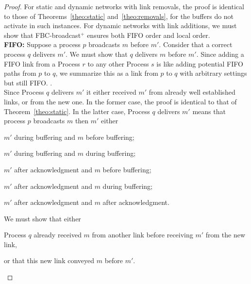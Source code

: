 \begin{theorem}
\end{theorem}

\begin{proof}
  For static and dynamic networks with link removals, the proof is identical to
  those of Theorems~\ref{theo:static} and~\ref{theo:removals}, for the buffers
  do not activate in such instances. For dynamic networks with link additions,
  we must show that FBC-broadcast$^+$ ensures both
  FIFO order and local order. \\
  \textbf{FIFO:} Suppose a process $p$ broadcasts $m$ before $m'$. Consider that
  a correct process $q$ delivers $m'$. We must show that $q$ delivers $m$ before
  $m'$.  Since adding a FIFO link from a Process $r$ to any other Process $s$ is
  like adding potential FIFO paths from $p$ to $q$, we summarize this as a link
  from $p$ to $q$ with arbitrary settings but still FIFO.  . \\   
  Since Process $q$ delivers $m'$ it either received $m'$ from already well
  established links, or from the new one. In the former case, the proof is
  identical to that of Theorem~\ref{theo:static}. In the latter case, Process
  $q$ delivers $m'$ means that process $p$ broadcasts $m$ then $m'$ either
  \begin{inparaenum}[(i)]
  \item \label{case:one} $m'$ during buffering and $m$ before buffering;
  \item \label{case:two} $m'$ during buffering and $m$ during buffering;
  \item \label{case:three} $m'$ after acknowledgment and $m$ before buffering;
  \item \label{case:four} $m'$ after acknowledgment and $m$ during buffering;
  \item \label{case:five} $m'$ after acknowledgment and $m$ after acknowledgment.
  \end{inparaenum}
  We must show that either 
  \begin{inparaenum}[(1)]
  \item \label{show:one} Process $q$ already received $m$ from another link
    before receiving $m'$ from the new link,
  \item \label{show:two} or that this new link conveyed $m$ before $m'$.
  \end{inparaenum}


\end{proof}
